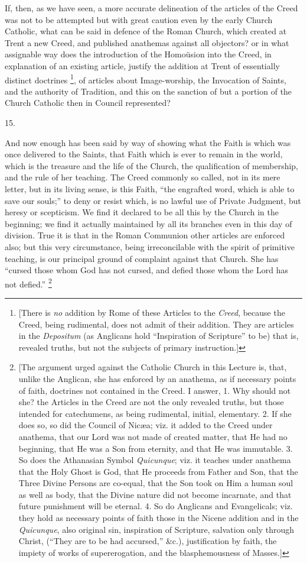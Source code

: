 If, then, as we have seen, a more accurate delineation of the
articles of the Creed was not to be attempted but with great caution
even by the early Church Catholic, what can be said in defence of the
Roman Church, which created at Trent a new Creed, and published
anathemas against all objectors? or in what assignable way does the
introduction of the Homoüsion into the Creed, in explanation of an
existing article, justify the addition at Trent of essentially
distinct doctrines \footnote{[There is \emph{no} addition by Rome of
these Articles to the \emph{Creed}, because the Creed, being
rudimental, does not admit of their addition. They are articles in the
\emph{Depositum} (as Anglicans hold ``Inspiration of
Scripture'' to be) that is, revealed truths, but not the subjects
of primary instruction.]}, of
articles about Image-worship, the Invocation of Saints, and the
authority of Tradition, and this on the sanction of but a
portion of the Church Catholic then in Council represented?

15.

And now enough has been said by way of showing what the Faith is
which was once delivered to the Saints, that Faith which is ever to
remain in the world, which is the treasure and the life of the Church,
the qualification of membership, and the rule of her teaching. The
Creed commonly so called, not in its mere letter, but in its living
sense, is this Faith, ``the engrafted word, which is able to save
our souls;'' to deny or resist which, is no lawful use of Private
Judgment, but heresy or scepticism. We find it declared to be all this
by the Church in the beginning; we find it actually maintained by all
its branches even in this day of division. True it is that in the
Roman Communion other articles are enforced also; but this very
circumstance, being irreconcilable with the spirit of primitive
teaching, is our principal ground of complaint against that Church.
She has ``cursed those whom God has not cursed, and defied those
whom the Lord has not defied.'' \footnote{[The argument urged against the Catholic
Church in this Lecture is, that, unlike the Anglican, she has enforced
by an anathema, as if necessary points of faith, doctrines not
contained in the Creed. I answer, 1. Why should not she? the Articles
in the Creed are not the only revealed truths, but those intended for
catechumens, as being rudimental, initial, elementary. 2. If she does
so, so did the Council of Nicæa; viz. it added to the Creed under
anathema, that our Lord was not made of created matter, that He had no
beginning, that He was a Son from eternity, and that He was immutable.
3. So does the Athanasian Symbol \emph{Quicunque}; viz. it teaches
under anathema that the Holy Ghost is God, that He proceeds from
Father and Son, that the Three Divine Persons are co-equal, that the
Son took on Him a human soul as well as body, that the Divine nature
did not become incarnate, and that future punishment will be eternal.
4. So do Anglicans and Evangelicals; viz. they hold as necessary
points of faith those in the Nicene addition and in the \emph{Quicunque},
also original sin, inspiration of Scripture, salvation only through
Christ, (``They are to be had accursed,'' \&c.),
justification by faith, the impiety of works of supererogation, and
the blasphemousness of Masses.]}

